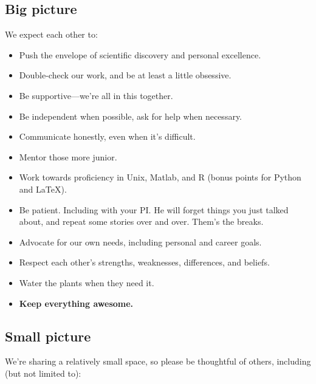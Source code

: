 \documentclass[letterpaper,12pt,oneside]{memoir}
\begin{document}
\subsection{Big picture}

We expect each other to:

\begin{itemize}
\item Push the envelope of scientific discovery and personal excellence. 
\item Double-check our work, and be at least a little obsessive.
\item Be supportive---we're all in this together.
\item Be independent when possible, ask for help when necessary.
\item Communicate honestly, even when it's difficult.
\item Mentor those more junior.
\item Work towards proficiency in Unix, Matlab, and R (bonus points for Python and LaTeX).
\item Be patient. Including with your PI. He will forget things you just talked about, and repeat some stories over and over. Them's the breaks.
\item Advocate for our own needs, including personal and career goals.
\item Respect each other's strengths, weaknesses, differences, and beliefs.
\item Water the plants when they need it.
\item \textbf{Keep everything awesome.}
\end{itemize}

\subsection{Small picture}

We're sharing a relatively small space, so please be thoughtful of others, including (but not limited to):
\end{document}
